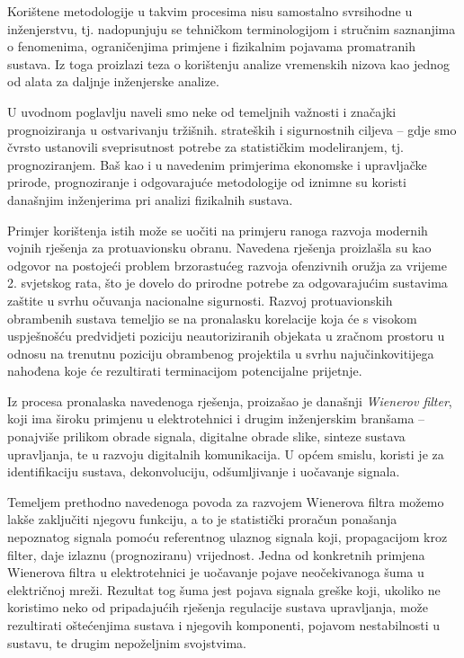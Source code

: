 \documentclass[a4paper,12pt,oneside]{memoir}
\begin{document}
            Korištene metodologije u takvim procesima nisu samostalno svrsihodne u inženjerstvu, tj. nadopunjuju se tehničkom terminologijom i stručnim saznanjima o fenomenima, ograničenjima primjene i fizikalnim pojavama promatranih sustava. Iz toga proizlazi teza o korištenju analize vremenskih nizova kao jednog od alata za daljnje inženjerske analize.


            U uvodnom poglavlju naveli smo neke od temeljnih važnosti i značajki prognoiziranja u ostvarivanju tržišnih. strateških i sigurnostnih ciljeva -- gdje smo čvrsto ustanovili sveprisutnost potrebe za statističkim modeliranjem, tj. prognoziranjem. Baš kao i u navedenim primjerima ekonomske i upravljačke prirode, prognoziranje i odgovarajuće metodologije od iznimne su koristi današnjim inženjerima pri analizi fizikalnih sustava. 
            
            Primjer korištenja istih može se uočiti na primjeru ranoga razvoja modernih vojnih rješenja za protuavionsku obranu. Navedena rješenja proizlašla su kao odgovor na postojeći problem brzorastućeg razvoja ofenzivnih oružja za vrijeme 2. svjetskog rata, što je dovelo do prirodne potrebe za odgovarajućim sustavima zaštite u svrhu očuvanja nacionalne  sigurnosti. Razvoj protuavionskih obrambenih sustava temeljio se na pronalasku korelacije koja će s visokom uspješnošću predvidjeti poziciju neautoriziranih objekata u zračnom prostoru u odnosu na trenutnu poziciju obrambenog projektila u svrhu najučinkovitijega nahođena koje će rezultirati terminacijom potencijalne prijetnje.
            
            Iz procesa pronalaska navedenoga rješenja, proizašao je današnji \textit{Wienerov filter}, koji ima široku primjenu u elektrotehnici i drugim inženjerskim branšama -- ponajviše prilikom obrade signala, digitalne obrade slike, sinteze sustava upravljanja, te u razvoju digitalnih komunikacija. U općem smislu, koristi je za identifikaciju sustava, dekonvoluciju, odšumljivanje i uočavanje signala.

            Temeljem prethodno navedenoga povoda za razvojem Wienerova filtra možemo lakše zaključiti njegovu funkciju, a to je statistički proračun ponašanja nepoznatog signala pomoću referentnog ulaznog signala koji, propagacijom kroz filter, daje izlaznu (prognoziranu) vrijednost. Jedna od konkretnih primjena Wienerova filtra u elektrotehnici je uočavanje pojave neočekivanoga šuma u električnoj mreži. Rezultat tog šuma jest pojava signala greške koji, ukoliko ne koristimo neko od pripadajućih rješenja regulacije sustava upravljanja, može rezultirati oštećenjima sustava i njegovih komponenti, pojavom nestabilnosti u sustavu, te drugim nepoželjnim svojstvima.
\end{document}
